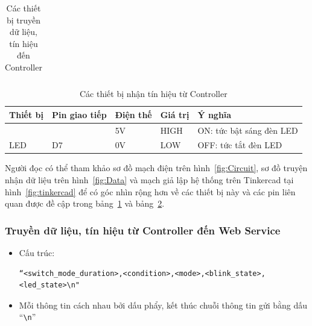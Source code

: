 {\begin{table}[H]
\begin{tabular}{|p{2.5cm}|p{2.5cm}|p{2.5cm}|p{2.5cm}|p{4.5cm}|}
\end{tabular}
\caption{Các thiết bị truyền dữ liệu, tín hiệu đến Controller}
\label{tab:data_photo_push}
\end{table}


\begin{table}[H]
\centering
\small
\begin{tabular}{|p{2.5cm}|p{2.5cm}|p{2.5cm}|p{2.5cm}|p{4.5cm}|}
\hline
{\textbf{Thiết bị}}     & {\textbf{Pin giao tiếp}} & {\textbf{Điện thế}} & {\textbf{Giá trị}} & {\textbf{Ý nghĩa}}         \\ \hline
{}                      & {}                       & {5V}                & {HIGH}             & {ON: tức bật sáng đèn LED} \\ \cline{3-5} 
\multirow{-2}{*}{{LED}} & \multirow{-2}{*}{{D7}}   & {0V}                & {LOW}              & {OFF: tức tắt đèn LED}     \\ \hline
\end{tabular}
\caption{Các thiết bị nhận tín hiệu từ Controller}
\label{tab:data_LED}
\end{table}

Người đọc có thể tham khảo sơ đồ mạch điện trên hình~\ref{fig:Circuit}, sơ đồ truyện nhận dữ liệu trên hình~\ref{fig:Data} và mạch giả lập hệ thống trên Tinkercad tại hình~\ref{fig:tinkercad} để có góc nhìn rộng hơn về các thiết bị này và các pin liên quan được đề cập trong bảng~\ref{tab:data_photo_push} và bảng~\ref{tab:data_LED}. 

\pagebreak
\subsubsection{Truyền dữ liệu, tín hiệu từ Controller đến Web Service}\label{subsec:data_UNO_to_Web}
\begin{itemize}
    \item Cấu trúc:
    \begin{lstlisting}
“<switch_mode_duration>,<condition>,<mode>,<blink_state>,<led_state>\n"\end{lstlisting}
    \item Mỗi thông tin cách nhau bởi dấu phẩy, kết thúc chuỗi thông tin gửi bằng dấu “\verb|\n|”
\end{itemize}

}
